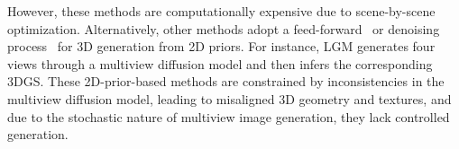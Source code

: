 However, these methods are computationally expensive due to scene-by-scene optimization. Alternatively, other methods adopt a feed-forward~\cite{xu2024grm, xu2024instantmesh,li2023instant3d,liu2024one,tang2025lgm,chen2025lara} or denoising process~\cite{wang2025crm,liu2024one++,xu2023dmv3d} for 3D generation from 2D priors. For instance, LGM generates four views through a multiview diffusion model and then infers the corresponding 3DGS. These 2D-prior-based methods are constrained by inconsistencies in the multiview diffusion model, leading to misaligned 3D geometry and textures, and due to the stochastic nature of multiview image generation, they lack controlled generation.



